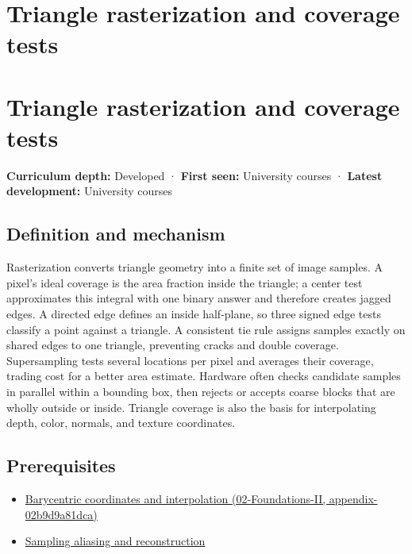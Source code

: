 \hypertarget{appendix-ed3f9bc298fe}{}
\section*{Triangle rasterization and coverage tests}
\section{Triangle rasterization and coverage tests}\label{appendix-ed3f9bc298fe-triangle-rasterization-and-coverage-tests}

\textbf{Curriculum depth:} Developed · \textbf{First seen:} University courses · \textbf{Latest development:} University courses

\subsection{Definition and mechanism}\label{appendix-ed3f9bc298fe-definition-and-mechanism}

Rasterization converts triangle geometry into a finite set of image samples. A pixel's ideal coverage is the area fraction inside the triangle; a center test approximates this integral with one binary answer and therefore creates jagged edges. A directed edge defines an inside half-plane, so three signed edge tests classify a point against a triangle. A consistent tie rule assigns samples exactly on shared edges to one triangle, preventing cracks and double coverage. Supersampling tests several locations per pixel and averages their coverage, trading cost for a better area estimate. Hardware often checks candidate samples in parallel within a bounding box, then rejects or accepts coarse blocks that are wholly outside or inside. Triangle coverage is also the basis for interpolating depth, color, normals, and texture coordinates.

\subsection{Prerequisites}\label{appendix-ed3f9bc298fe-prerequisites}

\begin{itemize}
\tightlist
\item
  \href{../02-Foundations-II/main.pdf\#nameddest=appendix-02b9d9a81dca}{Barycentric coordinates and interpolation (02-Foundations-II, appendix-02b9d9a81dca)}
\item
  \hyperref[appendix-6a7869dd79a6]{Sampling aliasing and reconstruction}
\end{itemize}

